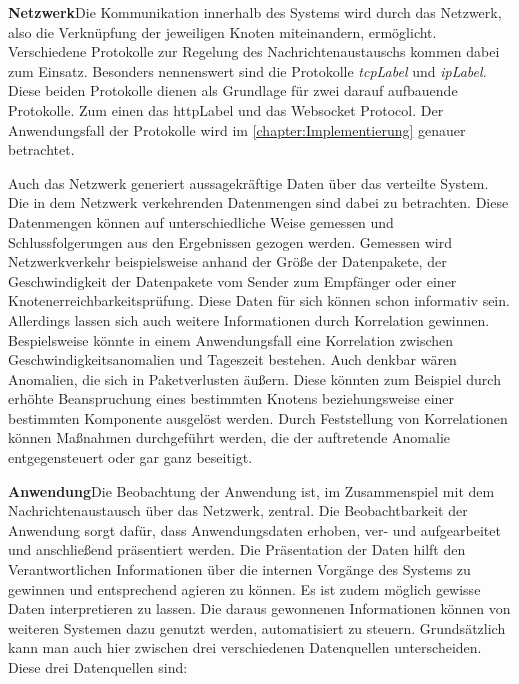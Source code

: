 	\textbf{Netzwerk}\space\space\space Die Kommunikation innerhalb des Systems wird durch das Netzwerk, also die Verknüpfung der jeweiligen Knoten miteinandern, ermöglicht. Verschiedene Protokolle zur Regelung des Nachrichtenaustauschs kommen dabei zum Einsatz. Besonders nennenswert sind die Protokolle \emph{\gls{tcpLabel}} und \emph{\gls{ipLabel}}. Diese beiden Protokolle dienen als Grundlage für zwei darauf aufbauende Protokolle. Zum einen das \gls{httpLabel} und das Websocket Protocol. Der Anwendungsfall der Protokolle wird im \cref{chapter:Implementierung} genauer betrachtet.
	
	Auch das Netzwerk generiert aussagekräftige Daten über das verteilte System. Die in dem Netzwerk verkehrenden Datenmengen sind dabei zu betrachten. Diese Datenmengen können auf unterschiedliche Weise gemessen und Schlussfolgerungen aus den Ergebnissen gezogen werden. Gemessen wird Netzwerkverkehr beispielsweise anhand der Größe der Datenpakete, der Geschwindigkeit der Datenpakete vom Sender zum Empfänger oder einer Knotenerreichbarkeitsprüfung. Diese Daten für sich können schon informativ sein. Allerdings lassen sich auch weitere Informationen durch Korrelation gewinnen. Bespielsweise könnte in einem Anwendungsfall eine Korrelation zwischen Geschwindigkeitsanomalien und Tageszeit bestehen. Auch denkbar wären Anomalien, die sich in Paketverlusten äußern. Diese könnten zum Beispiel durch erhöhte Beanspruchung eines bestimmten Knotens beziehungsweise einer bestimmten Komponente ausgelöst werden. Durch Feststellung von Korrelationen können Maßnahmen durchgeführt werden, die der auftretende Anomalie entgegensteuert oder gar ganz beseitigt.
	
	\textbf{Anwendung}\space\space\space Die Beobachtung der Anwendung ist, im Zusammenspiel mit dem Nachrichtenaustausch über das Netzwerk, zentral. Die Beobachtbarkeit der Anwendung sorgt dafür, dass Anwendungsdaten erhoben, ver- und aufgearbeitet und anschließend präsentiert werden. Die Präsentation der Daten hilft den Verantwortlichen Informationen über die internen Vorgänge des Systems zu gewinnen und entsprechend agieren zu können. Es ist zudem möglich gewisse Daten interpretieren zu lassen. Die daraus gewonnenen Informationen können von weiteren Systemen dazu genutzt werden, automatisiert zu steuern. Grundsätzlich kann man auch hier zwischen drei verschiedenen Datenquellen unterscheiden. Diese drei Datenquellen sind:
	
